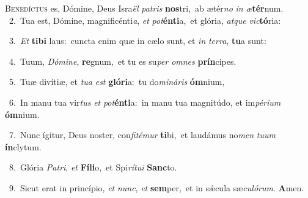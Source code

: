 \lettrine{\initial\textcolor{\initialcolor}{B}}{enedíctus} es, Dómine, Deus Isra\textit{ël} \textit{pa}\-\textit{tris} \textbf{nos}\-tri,~\star ab ætér\textit{no} \textit{in} \textit{æ}\-\textbf{tér}num.\\
{\numbfont\textcolor{\numbcolor}{~2.}}~Tua est, Dómine, magnificénti\-\textit{a}\-, \textit{et} \textit{pot}\-\textbf{én}\textbf{ti}a,~\star et glória, \textit{at}\-\textit{que} \textit{vic}\-\textbf{tó}ria:\par
{\numbfont\textcolor{\numbcolor}{~3.}}~\textit{Et} \textbf{ti}\-\textbf{bi} laus:~\star cuncta enim quæ in cælo sunt, et \textit{in} \textit{ter}\-\textit{ra}, \textbf{tu}\-a sunt:\par
{\numbfont\textcolor{\numbcolor}{~4.}}~Tuum, \textit{Dó}\-\textit{mi}\textit{ne}, \textbf{re}\-gnum,~\star et tu es su\textit{per} \textit{om}\-\textit{nes} \textbf{prín}\-cipes.\par
{\numbfont\textcolor{\numbcolor}{~5.}}~Tuæ divítiæ, et \textit{tu}\-\textit{a} \textit{est} \textbf{gló}\-\textbf{ri}a:~\star tu do\-\textit{mi}\-\textit{ná}\textit{ris} \textbf{óm}\-nium,\par
{\numbfont\textcolor{\numbcolor}{~6.}}~In manu tua vir\textit{tus} \textit{et} \textit{pot}\-\textbf{én}\textbf{ti}a:~\star in manu tua magnitúdo, et im\-\textit{pé}\-\textit{ri}\textit{um} \textbf{óm}\-nium.\par
{\numbfont\textcolor{\numbcolor}{~7.}}~Nunc ígitur, Deus noster, con\-\textit{fi}\-\textit{té}\textit{mur} \textbf{ti}\-bi,~\star et laudámus no\textit{men} \textit{tu}\-\textit{um} \textbf{ín}\-clytum.\par
{\numbfont\textcolor{\numbcolor}{~8.}}~Glória \textit{Pa}\-\textit{tri}, \textit{et} \textbf{Fí}\-\textbf{li}o,~\star et Spi\-\textit{rí}\-\textit{tu}\textit{i} \textbf{Sanc}\-to.\par
{\numbfont\textcolor{\numbcolor}{~9.}}~Sicut erat in princípio, \textit{et} \textit{nunc}\-, \textit{et} \textbf{sem}\-per,~\star et in sǽcula sæ\-\textit{cu}\-\textit{ló}\textit{rum}. \textbf{A}\-men.\par
